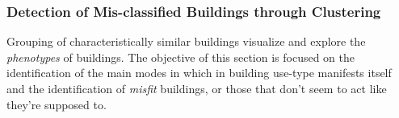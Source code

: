 \subsubsection{Detection of Mis-classified Buildings through Clustering}
\label{sec:clustering}

Grouping of characteristically similar buildings visualize and explore the \emph{phenotypes} of buildings. The objective of this section is focused on the identification of the main modes in which in building use-type manifests itself and the identification of \emph{misfit} buildings, or those that don't seem to act like they're supposed to.